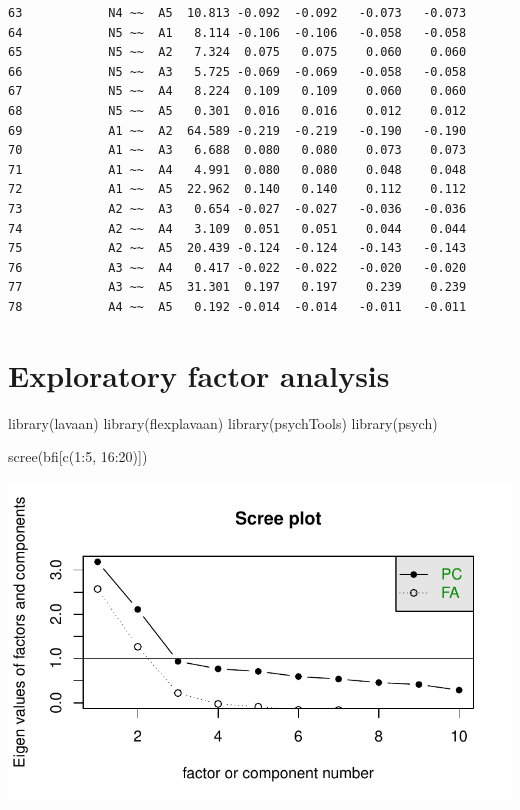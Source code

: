 \documentclass[
  letterpaper,
  DIV=11,
  numbers=noendperiod]{scrreprt}
\newenvironment{Shaded}{\begin{snugshade}}{\end{snugshade}}
\newcommand{\DecValTok}[1]{\textcolor[rgb]{0.68,0.00,0.00}{#1}}
\newcommand{\FunctionTok}[1]{\textcolor[rgb]{0.28,0.35,0.67}{#1}}
\newcommand{\NormalTok}[1]{\textcolor[rgb]{0.00,0.23,0.31}{#1}}
\newcommand{\SpecialCharTok}[1]{\textcolor[rgb]{0.37,0.37,0.37}{#1}}
\begin{document}
\begin{verbatim}
63            N4 ~~  A5  10.813 -0.092  -0.092   -0.073   -0.073
64            N5 ~~  A1   8.114 -0.106  -0.106   -0.058   -0.058
65            N5 ~~  A2   7.324  0.075   0.075    0.060    0.060
66            N5 ~~  A3   5.725 -0.069  -0.069   -0.058   -0.058
67            N5 ~~  A4   8.224  0.109   0.109    0.060    0.060
68            N5 ~~  A5   0.301  0.016   0.016    0.012    0.012
69            A1 ~~  A2  64.589 -0.219  -0.219   -0.190   -0.190
70            A1 ~~  A3   6.688  0.080   0.080    0.073    0.073
71            A1 ~~  A4   4.991  0.080   0.080    0.048    0.048
72            A1 ~~  A5  22.962  0.140   0.140    0.112    0.112
73            A2 ~~  A3   0.654 -0.027  -0.027   -0.036   -0.036
74            A2 ~~  A4   3.109  0.051   0.051    0.044    0.044
75            A2 ~~  A5  20.439 -0.124  -0.124   -0.143   -0.143
76            A3 ~~  A4   0.417 -0.022  -0.022   -0.020   -0.020
77            A3 ~~  A5  31.301  0.197   0.197    0.239    0.239
78            A4 ~~  A5   0.192 -0.014  -0.014   -0.011   -0.011
\end{verbatim}


\chapter{Exploratory factor analysis}\label{exploratory-factor-analysis}

\begin{Shaded}
\begin{Highlighting}[]
\FunctionTok{library}\NormalTok{(lavaan)}
\FunctionTok{library}\NormalTok{(flexplavaan)}
\FunctionTok{library}\NormalTok{(psychTools)}
\FunctionTok{library}\NormalTok{(psych)}

\FunctionTok{scree}\NormalTok{(bfi[}\FunctionTok{c}\NormalTok{(}\DecValTok{1}\SpecialCharTok{:}\DecValTok{5}\NormalTok{, }\DecValTok{16}\SpecialCharTok{:}\DecValTok{20}\NormalTok{)])}
\end{Highlighting}
\end{Shaded}

\includegraphics{EFA_files/figure-pdf/unnamed-chunk-1-1.pdf}
\end{document}
